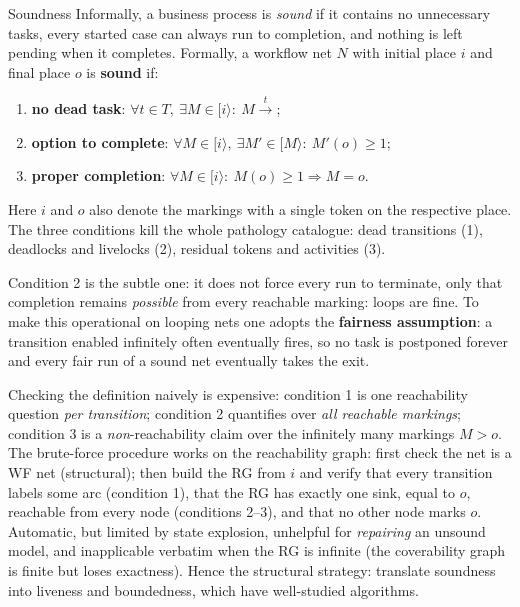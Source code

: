 \begin{definitionbox}{Soundness}
Informally, a business process is \emph{sound} if it contains no unnecessary tasks, every started case can always run to completion, and nothing is left pending when it completes. Formally, a workflow net $N$ with initial place $i$ and final place $o$ is \textbf{sound} if:
\begin{enumerate}
  \item \textbf{no dead task}: $\forall t \in T,\ \exists M \in [i\rangle :\ M \xrightarrow{t}$;
  \item \textbf{option to complete}: $\forall M \in [i\rangle,\ \exists M' \in [M\rangle :\ M'(o) \geq 1$;
  \item \textbf{proper completion}: $\forall M \in [i\rangle :\ M(o) \geq 1 \Rightarrow M = o$.
\end{enumerate}
Here $i$ and $o$ also denote the markings with a single token on the respective place. The three conditions kill the whole pathology catalogue: dead transitions (1), deadlocks and livelocks (2), residual tokens and activities (3).
\end{definitionbox}

Condition 2 is the subtle one: it does not force every run to terminate, only that completion remains \emph{possible} from every reachable marking: loops are fine. To make this operational on looping nets one adopts the \textbf{fairness assumption}: a transition enabled infinitely often eventually fires, so no task is postponed forever and every fair run of a sound net eventually takes the exit.

Checking the definition naively is expensive: condition 1 is one reachability question \emph{per transition}; condition 2 quantifies over \emph{all reachable markings}; condition 3 is a \emph{non}-reachability claim over the infinitely many markings $M > o$. The brute-force procedure works on the reachability graph: first check the net is a WF net (structural); then build the RG from $i$ and verify that every transition labels some arc (condition 1), that the RG has exactly one sink, equal to $o$, reachable from every node (conditions 2--3), and that no other node marks $o$. Automatic, but limited by state explosion, unhelpful for \emph{repairing} an unsound model, and inapplicable verbatim when the RG is infinite (the coverability graph is finite but loses exactness). Hence the structural strategy: translate soundness into liveness and boundedness, which have well-studied algorithms.

